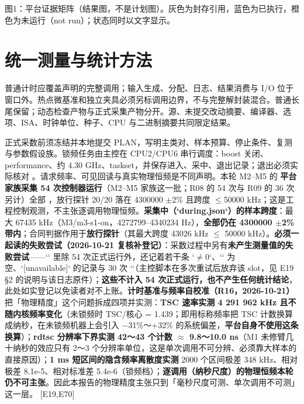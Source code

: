 \documentclass[UTF8,fontset=fandol,11pt,a4paper]{ctexart}
\begin{document}
\noindent 图1：平台证据矩阵（结果图，不是计划图）。灰色为封存引用，蓝色为已执行，橙色为未运行（not run）；状态同时以文字显示。\par\endgroup\vspace{3mm}
\section{统一测量与统计方法}
普通计时应覆盖声明的完整调用；输入生成、分配、日志、结果消费与 I/O 位于窗口外。热点微基准和独立夹具必须另标调用边界，不与完整解封装混合。普通长尾保留；动态检查产物与正式采集产物分开。源、未提交改动摘要、编译器、选项、ISA、时钟单位、种子、CPU 与二进制摘要共同限定结果。


正式采数前须冻结并本地提交 PLAN，写明主类对、样本预算、停止条件、复测与参数假设族。锁频任务由主控在 CPU2/CPU6 串行调度：boost 关闭、performance、约 4.30 GHz、taskset，并保存进入、采中、退出记录；退出必须实际核对 \texttt{}。请求频率、可见回读与真实物理恒频是不同声明。本轮 M2–M5 的 \textbf{平台家族采集 54 次控制器运行}（M2–M5 家族这一批；R08 的 54 次与 R09 的 36 次另计）全部 \texttt{}，放行探针 20/20 落在 4300000 \texorpdfstring{$\pm$}{+-}2\% 且跨度 \texorpdfstring{$\le$}{<=}50000 kHz；这是工程控制观测，不主张逐调用物理恒频。\textbf{采集中（`during.json`）的样本跨度}：最大 67435 kHz（M3/m3-s1-on，4272799–4340234 Hz），\textbf{全部仍在 4300000 \texorpdfstring{$\pm$}{+-}2\% 带内}；合同判据作用于\textbf{放行探针}（其最大跨度 43026 kHz \texorpdfstring{$\le$}{<=} 50000 kHz）。\textbf{必须一起读的失败尝试（2026-10-21 复核补登记）}：采数过程中另有\textbf{未产生测量值的失败尝试}——`\texttt{}` 里除 54 次正式运行外，还记着若干条 `\texttt{}\texorpdfstring{$\neq$}{!=}0`、`\texttt{}` 为空、`\texttt{}[unavailable]` 的记录与 30 次 `\texttt{}`（主控脚本在多次重试后放弃该 slot，见 E19 §2 的说明与该日志原件）；\textbf{这些不计入 54 次正式运行，也不产生任何统计结论}，此处如实登记以免读者对不上账。\textbf{计时基准与频率自校准（R16，2026-10-21）}把「物理精度」这个问题拆成四项并实测：\textbf{TSC 速率实测 4 291 962 kHz 且不随内核频率变化}（未锁频时 TSC/核心 = 1.439；即用标称频率把 TSC 计数换算成纳秒，在未锁频机器上会引入 \texorpdfstring{$-$}{-}31\%～+32\% 的系统偏差，\textbf{平台自身不使用这条换算}）；\textbf{rdtsc 分辨率下界实测 42～43 个计数 \texorpdfstring{$\approx$}{~=} 9.8～10.0 ns}（M1 未修臂几十纳秒的效应只有 2～3 个分辨率单位，这是单次调用不可分辨、必须靠大样本的直接原因）；\textbf{1 ms 短区间的隐含频率离散度实测} 2000 个区间极差 348 kHz、相对极差 8.1e-5、相对标准差 5.4e-6（锁频档）；\textbf{逐调用（纳秒尺度）的物理恒频本轮仍不可主张}。因此本报告的物理精度主张只到「毫秒尺度可测、单次调用不可测」这一层。 [E19,E70]
\end{document}
